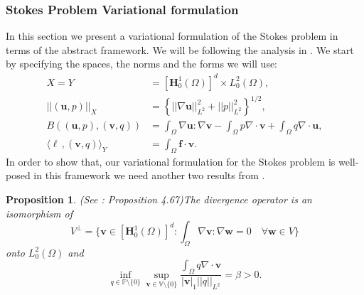 \documentclass[12pt,a4paper]{article}
\newtheorem{proposition}[theorem]{Proposition}
\theoremstyle{definition}
\begin{document}
\subsubsection{Stokes Problem Variational formulation}
In this section we present a variational formulation of the Stokes problem in terms of the abstract framework.  We will be following the analysis in \cite[\S 4.10]{verfurth2013posteriori}.   We start by specifying the spaces, the norms and the forms we will use:
\begin{equation}\label{verf_eqns}
\begin{aligned}
X=Y&=\left[\textbf{H}^1_0\left(\Omega\right)\right]^d\times L^2_0\left(\Omega\right),\\
\left|\left|\left(\textbf{u},p\right)\right|\right|_X&=\left\lbrace \left|\left|\nabla\textbf{u}\right|\right|^2_{L^2} + \left|\left|p\right|\right|^2_{L^2}\right\rbrace^{1/2},\\
B\left(\left(\textbf{u},p\right),\left(\textbf{v},q\right)\right)&=\int_{\Omega}\nabla \textbf{u} : \nabla \textbf{v} - \int_{\Omega} p \nabla\cdot\textbf{v} + \int_{\Omega} q \nabla\cdot\textbf{u},\\
\langle \ell\,,\left(\textbf{v},q\right) \rangle_Y &= \int_{\Omega}\textbf{f}\cdot \textbf{v}.
\end{aligned}
\end{equation}
In order to show that, our variational formulation for the Stokes problem is well-posed in this framework we need another two results from \cite{verfurth2013posteriori}.
\begin{proposition}(See \cite[\S 4.10]{verfurth2013posteriori}: Proposition 4.67)\label{prop_well_pos_verf_saddle_1}
	The divergence  operator is an isomorphism of 
	\begin{equation}
		V^{\perp} =\lbrace \textbf{v}\in \left[\textbf{H}^1_0\left(\Omega\right)\right]^d: \int_{\Omega}\nabla\textbf{v}:\nabla\textbf{w}=0\quad \forall \textbf{w}\in V \rbrace\nonumber
	\end{equation}
	onto $L^2_0\left(\Omega\right)$ and
	\begin{equation}\label{verf_infsup_q}
	\inf_{q\in \mathbb{P}\setminus \lbrace 0 \rbrace}\sup_{\textbf{v}\in \mathbb{V}\setminus \lbrace 0 \rbrace}\frac{\int_{\Omega}q\nabla\cdot\textbf{v}}{\left|\textbf{v}\right|_1 \left|\left|q\right|\right|_{L^2}}=\beta>0.\nonumber
	\end{equation}
\end{proposition}
\end{document}

